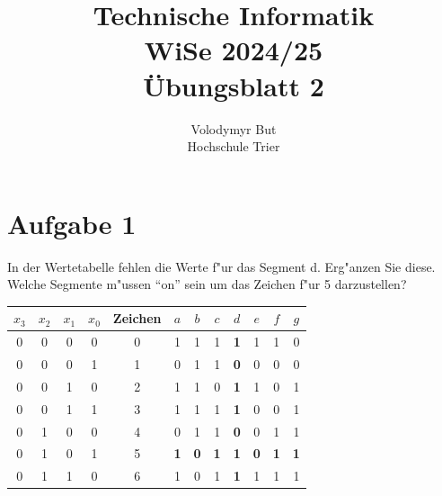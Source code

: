 \documentclass[10pt, oneside]{article}
\title{Technische Informatik\\[10pt]\Large{WiSe 2024/25}\\[15pt]\Large{{\"U}bungsblatt 2}}
\author{Volodymyr But\\[10pt]Hochschule Trier}
\date{}
\begin{document}
\sloppy

\maketitle
\vspace{25px}

\section{Aufgabe 1}

In der Wertetabelle fehlen die Werte f"ur das Segment d. Erg"anzen Sie diese.
Welche Segmente m"ussen \enquote{on} sein um das Zeichen f"ur 5 darzustellen?

\vspace{5pt}

\begin{minipage}{0.69\linewidth}
    \bgroup
    \def\arraystretch{1.25}
    \begin{tabular}{|c|c|c|c|c|c|c|c|c|c|c|c|}
        \hline
        $x_3$ & $x_2$ & $x_1$ & $x_0$ & Zeichen & $a$        & $b$        & $c$        & $d$               & $e$        & $f$        & $g$        \\
        \hline
        0     & 0     & 0     & 0     & 0       & 1          & 1          & 1          & \textbf{1}        & 1          & 1          & 0          \\
        \hline
        0     & 0     & 0     & 1     & 1       & 0          & 1          & 1          & \textbf{0}        & 0          & 0          & 0          \\
        \hline
        0     & 0     & 1     & 0     & 2       & 1          & 1          & 0          & \textbf{1}        & 1          & 0          & 1          \\
        \hline
        0     & 0     & 1     & 1     & 3       & 1          & 1          & 1          & \textbf{1}        & 0          & 0          & 1          \\
        \hline
        0     & 1     & 0     & 0     & 4       & 0          & 1          & 1          & \textbf{0}        & 0          & 1          & 1          \\
        \hline
        0     & 1     & 0     & 1     & 5       & \textbf{1} & \textbf{0} & \textbf{1} & \textbf{1}        & \textbf{0} & \textbf{1} & \textbf{1} \\
        \hline
        0     & 1     & 1     & 0     & 6       & 1          & 0          & 1          & \textbf{1}        & 1          & 1          & 1          \\

\end{tabular}
\end{minipage}
\end{document}
